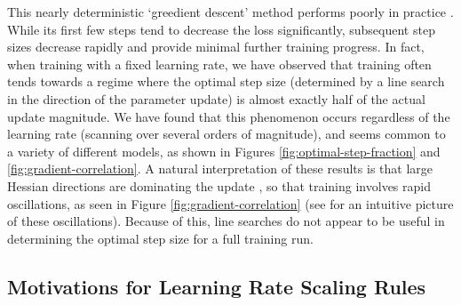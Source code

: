 \documentclass[english]{article}
\begin{document}
This nearly deterministic `greedient descent' method performs poorly in practice \cite{1803.02021}.  While its first few steps tend to decrease the loss significantly, subsequent step sizes decrease rapidly and provide minimal further training progress.  In fact, when training with a fixed learning rate, we have observed that training often tends towards a regime where the optimal step size (determined by a line search in the direction of the parameter update) is almost exactly half of the actual update magnitude.  We have found that this phenomenon occurs regardless of the learning rate (scanning over several orders of magnitude), and seems common to a variety of different models, as shown in Figures \ref{fig:optimal-step-fraction} and \ref{fig:gradient-correlation}.
A natural interpretation of these results is that large Hessian directions are dominating the update \cite{unpublished-grd}, so that training involves rapid oscillations, as seen in Figure \ref{fig:gradient-correlation} (see \cite{goh2017why} for an intuitive picture of these oscillations).  Because of this, line searches do not appear to be useful in determining the optimal step size for a full training run.

\subsection{Motivations for Learning Rate Scaling Rules}
\label{app:ScalingRuleMotivation}
\end{document}
